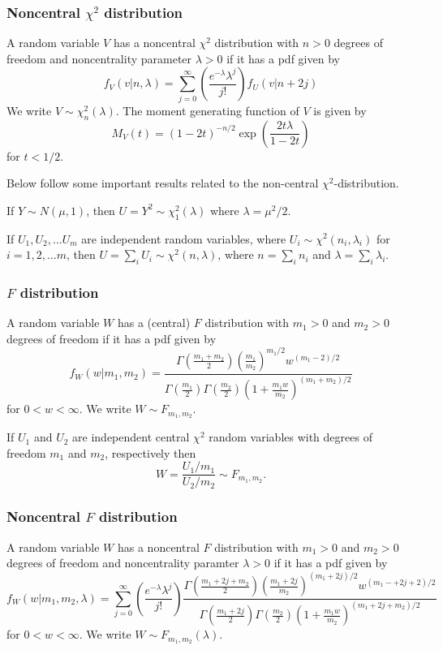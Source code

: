 \vb


\subsubsection{Noncentral $\chi^2$ distribution}

A random variable $V$ has a noncentral $\chi^2$ distribution with $n>0$ degrees of freedom and noncentrality parameter $\lambda >0$ if it has a pdf given by
$$
f_V(v|n,\lambda) =  \sum_{j=0}^\infty \left( \frac{e^{-\lambda} \lambda^j}{j!} \right) f_U(v|n+2j)
$$
\vb
We write $V \sim \chi^2_n(\lambda)$. The moment generating function of $V$ is given by
$$M_V(t) = (1-2t)^{-n/2} \exp \left( \frac{2t\lambda}{1-2t} \right)$$ for $t<1/2$.


Below follow some important results related to the non-central $\chi^2$-distribution.

\bstheo
If $Y \sim N(\mu, 1)$, then $U=Y^2 \sim \chi^2_1(\lambda)$ where $\lambda = \mu^2/2$.
\estheo

\bstheo
If $U_1, U_2, \ldots U_m$ are independent random variables, where $U_i \sim \chi^2(n_i,\lambda_i)$ for $i=1,2, \ldots m$, then $U=\sum_i U_i \sim \chi^2(n,\lambda)$, where $n=\sum_i n_i$ and $\lambda = \sum_i \lambda_i$. 
\estheo




\subsubsection{ $F$ distribution}

A random variable $W$ has a (central) $F$ distribution with $m_1 >0$ and  $m_2 >0 $ degrees of freedom if it has a pdf given by
$$
f_W(w|m_1,m_2) =\frac{ \Gamma \left( \frac{m_1+m_2}{2} \right)  \left( \frac{m_1}{m_2} \right)^{m_1/2}  w^{(m_1-2)/2}   }{\Gamma \left( \frac{m_1}{2} \right)  \Gamma \left( \frac{m_2}{2} \right) \left( 1+  \frac{m_1 w}{m_2}  \right)^{(m_1 + m_2)/2}}
$$
for $0 < w < \infty.$
We write $W \sim F_{m_1,m_2}$.

If $U_1$ and $U_2$ are independent central $\chi^2$ random variables with degrees of freedom $m_1$ and $m_2$, respectively
then
$$
W = \frac{U_1/m_1}{U_2/m_2} \sim F_{m_1,m_2}.
$$


\subsubsection{Noncentral $F$ distribution}
A random variable $W$ has a noncentral $F$ distribution with $m_1 >0$ and  $m_2 >0 $ degrees of freedom and noncentrality paramter $\lambda >0$ if it has a pdf given by
$$
f_W(w|m_1,m_2, \lambda) = 
\sum_{j=0}^\infty \left( \frac{e^{-\lambda} \lambda^j}{j!} \right) \frac{ \Gamma \left( \frac{m_1+2j+m_2}{2} \right)  \left( \frac{m_1+2j}{m_2} \right)^{(m_1+2j)/2}  w^{(m_1- +2j+2)/2}   }{\Gamma \left( \frac{m_1+2j}{2} \right)  \Gamma \left( \frac{m_2}{2} \right) \left( 1+  \frac{m_1 w}{m_2}  \right)^{(m_1 + 2j+ m_2)/2}}
$$
for $0 < w < \infty.$
We write $W \sim F_{m_1,m_2}(\lambda)$.

